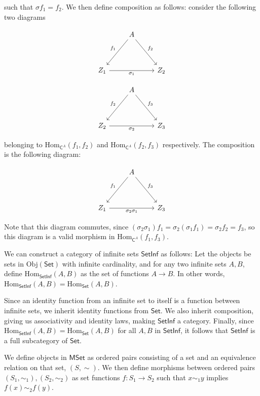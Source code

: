 such that $\sigma f_1=f_2$. We then define composition as follows: consider the following two diagrams

\[\begin{tikzcd}
	& A & \\
	\\
	Z_1 && Z_2
	\arrow["f_1"', from=1-2, to=3-1]
	\arrow["f_2", from=1-2, to=3-3]
	\arrow["\sigma_1"', from=3-1, to=3-3]
\end{tikzcd}\]

\[\begin{tikzcd}
	& A & \\
	\\
	Z_2 && Z_3
	\arrow["f_2"', from=1-2, to=3-1]
	\arrow["f_3", from=1-2, to=3-3]
	\arrow["\sigma_2"', from=3-1, to=3-3]
\end{tikzcd}\]

belonging to $\text{Hom}_{\textsf{C}^A}(f_1,f_2)$ and $\text{Hom}_{\textsf{C}^A}(f_2,f_3)$ respectively. The composition is the following diagram:

\[\begin{tikzcd}
	& A & \\
	\\
	Z_1 && Z_3
	\arrow["f_1"', from=1-2, to=3-1]
	\arrow["f_3", from=1-2, to=3-3]
	\arrow["\sigma_2 \sigma_1"', from=3-1, to=3-3]
\end{tikzcd}\]

Note that this diagram commutes, since $(\sigma_2 \sigma_1) f_1 = \sigma_2 (\sigma_1 f_1) = \sigma_2 f_2 = f_3$, so this diagram is a valid morphism in $\text{Hom}_{\textsf{C}^A}(f_1,f_3)$.

\exercise We can construct a category of infinite sets $\textsf{SetInf}$ as follows: Let the objects be sets in $\text{Obj}(\textsf{Set})$ with infinite cardinality, and for any two infinite sets $A,B$, define $\text{Hom}_{\textsf{SetInf}}(A,B)$ as the set of functions $A \to B$. In other words,  $\text{Hom}_{\textsf{SetInf}}(A,B) = \text{Hom}_{\textsf{Set}}(A,B)$.

Since an identity function from an infinite set to itself is a function between infinite sets, we inherit identity functions from $\textsf{Set}$. We also inherit composition, giving us associativity and identity laws, making $\textsf{SetInf}$ a category. Finally, since $\text{Hom}_{\textsf{SetInf}}(A,B) = \text{Hom}_{\textsf{Set}}(A,B)$ for all $A,B$ in $\textsf{SetInf}$, it follows that $\textsf{SetInf}$ is a full subcategory of $\textsf{Set}$.

\exercise We define objects in $\textsf{MSet}$ as ordered pairs consisting of a set and an equivalence relation on that set, $(S, \sim)$. We then define morphisms between ordered pairs $(S_1, \sim_1), (S_2, \sim_2)$ as set functions $f: S_1 \to S_2$ such that $x \sim_1 y$ implies $f(x) \sim_2 f(y)$. \\

